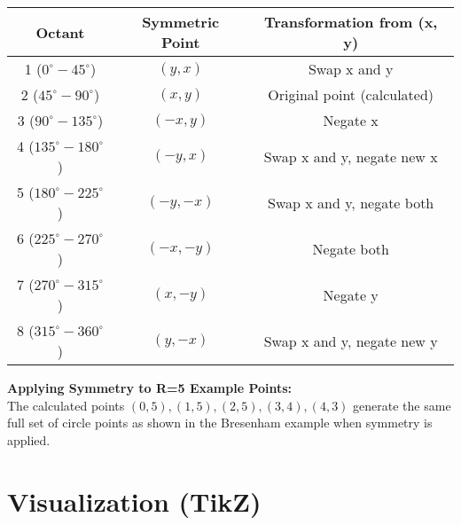 \documentclass[12pt, a4paper]{article}
\begin{document}
\begin{center}
\label{tab:midpoint_symmetry}
\begin{tabular}{ccc}
\toprule
\textbf{Octant} & \textbf{Symmetric Point} & \textbf{Transformation from (x, y)} \\
\midrule
1 ($0^\circ-45^\circ$) & $(y, x)$ & Swap x and y \\
2 ($45^\circ-90^\circ$) & $(x, y)$ & Original point (calculated) \\
3 ($90^\circ-135^\circ$) & $(-x, y)$ & Negate x \\
4 ($135^\circ-180^\circ$) & $(-y, x)$ & Swap x and y, negate new x \\
5 ($180^\circ-225^\circ$) & $(-y, -x)$ & Swap x and y, negate both \\
6 ($225^\circ-270^\circ$) & $(-x, -y)$ & Negate both \\
7 ($270^\circ-315^\circ$) & $(x, -y)$ & Negate y \\
8 ($315^\circ-360^\circ$) & $(y, -x)$ & Swap x and y, negate new y \\
\bottomrule
\end{tabular}
\end{center}

\textbf{Applying Symmetry to R=5 Example Points:}\\
The calculated points $(0, 5), (1, 5), (2, 5), (3, 4), (4, 3)$ generate the same full set of circle points as shown in the Bresenham example when symmetry is applied.

\section{Visualization (TikZ)}
\end{document}
